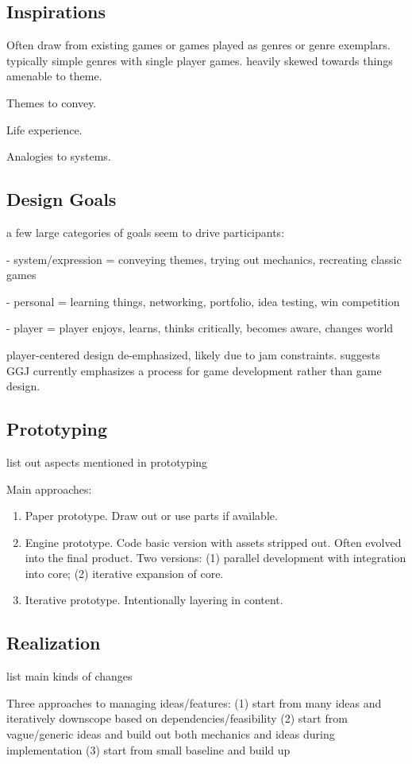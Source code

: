 \documentclass{sig-alternate}
\begin{document}
\subsection{Inspirations}
Often draw from existing games or games played as genres or genre exemplars. typically simple genres with single player games. heavily skewed towards things amenable to theme.

Themes to convey.

Life experience.

Analogies to systems.

\subsection{Design Goals}
a few large categories of goals seem to drive participants:

- system/expression = conveying themes, trying out mechanics, recreating classic games

- personal = learning things, networking, portfolio, idea testing, win competition

- player = player enjoys, learns, thinks critically, becomes aware, changes world

player-centered design de-emphasized, likely due to jam constraints. suggests GGJ currently emphasizes a process for game development rather than game design.

\subsection{Prototyping}
list out aspects mentioned in prototyping

Main approaches:
\begin{enumerate}
\item Paper prototype. Draw out or use parts if available.
\item Engine prototype. Code basic version with assets stripped out. Often evolved into the final product. Two versions: (1) parallel development with integration into core; (2) iterative expansion of core.
\item Iterative prototype. Intentionally layering in content.
\end{enumerate}

\subsection{Realization}
list main kinds of changes

Three approaches to managing ideas/features: 
(1) start from many ideas and iteratively downscope based on dependencies/feasibility
(2) start from vague/generic ideas and build out both mechanics and ideas during implementation
(3) start from small baseline and build up
\end{document}
